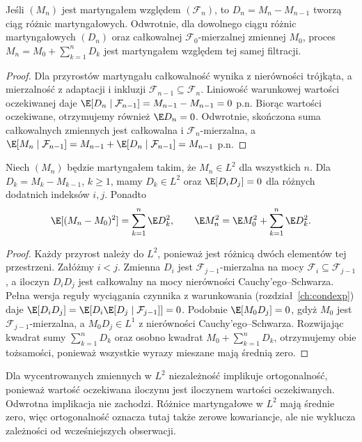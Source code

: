 \begin{stwierdzenie}
\label{prop:rp1-14-differences}
Jeśli $(M_n)$ jest martyngałem względem
$(\mathcal F_n)$, to $D_n=M_n-M_{n-1}$ tworzą
ciąg różnic martyngałowych.
Odwrotnie, dla dowolnego ciągu różnic
martyngałowych $(D_n)$ oraz całkowalnej
$\mathcal F_0$-mierzalnej zmiennej $M_0$,
proces $M_n=M_0+\sum_{k=1}^nD_k$ jest
martyngałem względem tej samej filtracji.
\end{stwierdzenie}
\begin{proof}
Dla przyrostów martyngału całkowalność wynika
z nierówności trójkąta, a mierzalność z adaptacji
i inkluzji $\mathcal F_{n-1}\subseteq\mathcal F_n$.
Liniowość warunkowej wartości oczekiwanej daje
$\E[D_n\mid\mathcal F_{n-1}]=M_{n-1}-M_{n-1}=0$ p.n.
Biorąc wartości oczekiwane, otrzymujemy również
$\E D_n=0$.
Odwrotnie, skończona suma całkowalnych zmiennych
jest całkowalna i $\mathcal F_n$-mierzalna,
a $\E[M_n\mid\mathcal F_{n-1}]
=M_{n-1}+\E[D_n\mid\mathcal F_{n-1}]=M_{n-1}$ p.n.
\end{proof}

\begin{twierdzenie}
Niech $(M_n)$ będzie martyngałem takim, że
$M_n\in L^2$ dla wszystkich $n$. Dla
$D_k=M_k-M_{k-1}$, $k\geq1$, mamy
$D_k\in L^2$ oraz $\E[D_iD_j]=0$ dla
różnych dodatnich indeksów $i,j$. Ponadto
\[
\E[(M_n-M_0)^2]=\sum_{k=1}^n\E D_k^2,
\qquad
\E M_n^2=\E M_0^2+\sum_{k=1}^n\E D_k^2.
\]
\end{twierdzenie}
\begin{proof}
Każdy przyrost należy do $L^2$, ponieważ
jest różnicą dwóch elementów tej przestrzeni.
Załóżmy $i<j$. Zmienna $D_i$ jest
$\mathcal F_{j-1}$-mierzalna na mocy
$\mathcal F_i\subseteq\mathcal F_{j-1}$,
a iloczyn $D_iD_j$ jest całkowalny na mocy
nierówności Cauchy'ego--Schwarza. Pełna wersja reguły
wyciągania czynnika z warunkowania
(rozdział~\ref{ch:condexp}) daje
$\E[D_iD_j]=\E[D_i\E[D_j\mid\mathcal F_{j-1}]]=0$.
Podobnie $\E[M_0D_j]=0$, gdyż $M_0$ jest
$\mathcal F_{j-1}$-mierzalna, a $M_0D_j\in L^1$
z nierówności Cauchy'ego--Schwarza.
Rozwijając kwadrat sumy $\sum_{k=1}^nD_k$
oraz osobno kwadrat $M_0+\sum_{k=1}^nD_k$,
otrzymujemy obie tożsamości, ponieważ wszystkie
wyrazy mieszane mają średnią zero.
\end{proof}

\begin{uwaga}
Dla wycentrowanych zmiennych w $L^2$ niezależność
implikuje ortogonalność, ponieważ wartość oczekiwana
iloczynu jest iloczynem wartości oczekiwanych.
Odwrotna implikacja nie zachodzi. Różnice
martyngałowe w $L^2$ mają średnie zero, więc
ortogonalność oznacza tutaj także zerowe kowariancje,
ale nie wyklucza zależności od wcześniejszych obserwacji.
\end{uwaga}

